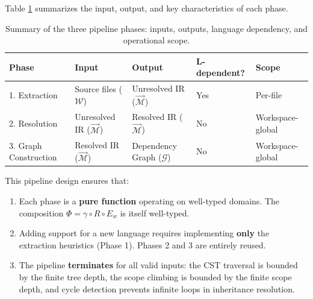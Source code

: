Table \ref{tab:pipeline_summary} summarizes the input, output, and
key characteristics of each phase.

\begin{table}[htpb]
  \centering
  \small
  \begin{tabular}{|l|l|l|l|l|}
    \hline
    \textbf{Phase} & \textbf{Input} & \textbf{Output} &
    \textbf{L-dependent?} & \textbf{Scope} \\ \hline
    1. Extraction & Source files ($\mathcal{W}$) & Unresolved IR
    ($\vec{\mathcal{M}}$) & Yes & Per-file \\ \hline
    2. Resolution & Unresolved IR ($\vec{\mathcal{M}}$) & Resolved IR
    ($\vec{\mathcal{M}}$) & No & Workspace-global \\ \hline
    3. Graph Construction & Resolved IR ($\vec{\mathcal{M}}$) &
    Dependency Graph ($\mathcal{G}$) & No & Workspace-global \\ \hline
  \end{tabular}
  \caption{Summary of the three pipeline phases: inputs, outputs,
  language dependency, and operational scope.}
  \label{tab:pipeline_summary}
\end{table}

This pipeline design ensures that:
\begin{enumerate}
  \item Each phase is a \textbf{pure function} operating on
    well-typed domains. The composition $\Phi = \gamma \circ R \circ
    E_w$ is itself well-typed.
  \item Adding support for a new language requires implementing
    \textbf{only} the extraction heuristics (Phase 1). Phases 2 and 3
    are entirely reused.
  \item The pipeline \textbf{terminates} for all valid inputs: the
    CST traversal is bounded by the finite tree depth, the scope
    climbing is bounded by the finite scope depth, and cycle
    detection prevents infinite loops in inheritance resolution.
\end{enumerate}
